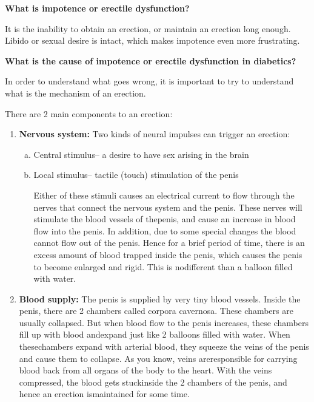 \noindent\textbf{What is impotence or erectile dysfunction?}

It is the inability to obtain an erection, or maintain an erection long enough. Libido or sexual desire is intact, which makes impotence even more frustrating.

\noindent\textbf{What is the cause of impotence or erectile dysfunction in dia\-betics?}

In order to understand what goes wrong, it is important to try to understand what is the mechanism of an erection.

\noindent There are 2 main components to an erection:

\vspace{-\topsep}
\begin{enumerate}
\itemsep=0pt
\item \textbf{Nervous system:} Two kinds of neural impulses can trigger an erection:
\begin{enumerate}[a)]
\itemsep=0pt
\item Central stimulus– a desire to have sex arising in the brain
\item Local stimulus– tactile (touch) stimulation of the penis

Either of these stimuli causes an electrical current to flow through the nerves that connect the nervous system and the penis. These nerves will stimulate the blood vessels of the\break penis, and cause an increase in blood flow into the penis. In addition, due to some special changes the blood cannot flow out of the penis. Hence for a brief period of time, there is an excess amount of blood trapped inside the penis, which causes the penis to become enlarged and rigid. This is no\break different than a balloon filled with water.
\end{enumerate}
\item \textbf{Blood supply:} The penis is supplied by very tiny blood vessels. Inside the penis, there are 2 chambers called corpora cavernosa. These chambers are usually collapsed. But when blood flow to the penis increases, these chambers fill up with blood and\break expand just like 2 balloons filled with water. When these\break chambers expand with arterial blood, they squeeze the veins of the penis and cause them to collapse. As you know, veins are\break responsible for carrying blood back from all organs of the body to the heart. With the veins compressed, the blood gets stuck\break inside the 2 chambers of the penis, and hence an erection is\break maintained for some time.


\end{enumerate}
